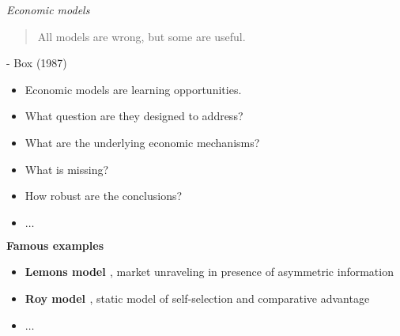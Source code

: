 \begin{frame}\begin{center}
		\LARGE\textit{Economic models}
\end{center}\end{frame}
\begin{frame}\begin{quote}
All models are wrong, but some are useful.
\end{quote}\vspace{-0.5pt} \hspace{6cm} - Box (1987)
\end{frame}
\begin{frame}

\begin{itemize}\setlength\itemsep{1em}
\item Economic models are learning opportunities.
\item What question are they designed to address?
\item What are the underlying economic mechanisms?
\item What is missing?
\item How robust are the conclusions?
\item $\hdots$
\end{itemize}

\end{frame}
\begin{frame}\textbf{Famous examples}\vspace{0.3cm}

\begin{itemize}\setlength\itemsep{1em}
\item \textbf{Lemons model \cite{Akerlof.1970}}, market unraveling in presence of asymmetric information
\item \textbf{Roy model \cite{Roy.1951}}, static model of self-selection and comparative advantage
\item $\hdots$
\end{itemize}

\end{frame}
